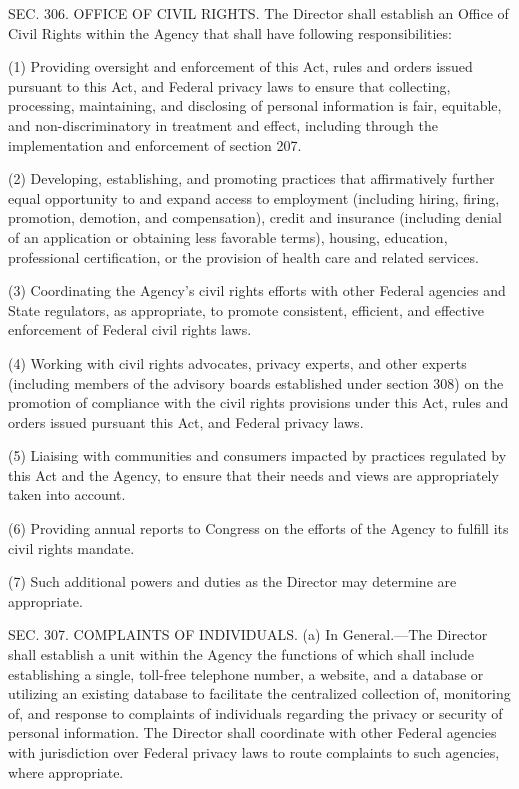 SEC. 306. OFFICE OF CIVIL RIGHTS.
The Director shall establish an Office of Civil Rights within the Agency that shall have following responsibilities:

(1) Providing oversight and enforcement of this Act, rules and orders issued pursuant to this Act, and Federal privacy laws to ensure that collecting, processing, maintaining, and disclosing of personal information is fair, equitable, and non-discriminatory in treatment and effect, including through the implementation and enforcement of section 207.

(2) Developing, establishing, and promoting practices that affirmatively further equal opportunity to and expand access to employment (including hiring, firing, promotion, demotion, and compensation), credit and insurance (including denial of an application or obtaining less favorable terms), housing, education, professional certification, or the provision of health care and related services.

(3) Coordinating the Agency’s civil rights efforts with other Federal agencies and State regulators, as appropriate, to promote consistent, efficient, and effective enforcement of Federal civil rights laws.

(4) Working with civil rights advocates, privacy experts, and other experts (including members of the advisory boards established under section 308) on the promotion of compliance with the civil rights provisions under this Act, rules and orders issued pursuant this Act, and Federal privacy laws.

(5) Liaising with communities and consumers impacted by practices regulated by this Act and the Agency, to ensure that their needs and views are appropriately taken into account.

(6) Providing annual reports to Congress on the efforts of the Agency to fulfill its civil rights mandate.

(7) Such additional powers and duties as the Director may determine are appropriate.


SEC. 307. COMPLAINTS OF INDIVIDUALS.
(a) In General.—The Director shall establish a unit within the Agency the functions of which shall include establishing a single, toll-free telephone number, a website, and a database or utilizing an existing database to facilitate the centralized collection of, monitoring of, and response to complaints of individuals regarding the privacy or security of personal information. The Director shall coordinate with other Federal agencies with jurisdiction over Federal privacy laws to route complaints to such agencies, where appropriate.

